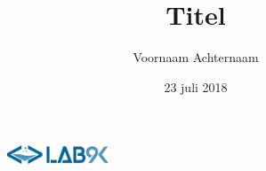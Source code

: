 \documentclass[11pt, letterpaper, oneside]{article}
\title{Titel}
\author{Voornaam Achternaam}
\date{23 juli 2018}
\begin{document}
	\begin{figure}
			\includegraphics[width=0.27\textwidth,keepaspectratio]{figuren/logo} %
	\end{figure}
	\vspace*{0.35cm}
	
	\noindent
	\fontsize{30pt}{28pt}\selectfont\textcolor{priColour}{\textbf{\@title}}\newline
	
	\fontsize{11pt}{15pt}\selectfont
	
	\lipsum[1]
\end{document}
